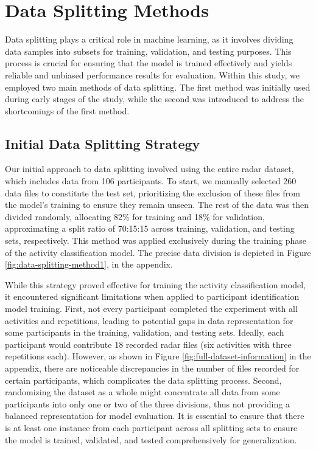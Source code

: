 \documentclass{l4proj}
\begin{document}
\section{Data Splitting Methods}
Data splitting plays a critical role in machine learning, as it involves dividing data samples into subsets for training, validation, and testing purposes. This process is crucial for ensuring that the model is trained effectively and yields reliable and unbiased performance results for evaluation. Within this study, we employed two main methods of data splitting. The first method was initially used during early stages of the study, while the second was introduced to address the shortcomings of the first method.

\subsection{Initial Data Splitting Strategy}
Our initial approach to data splitting involved using the entire radar dataset, which includes data from 106 participants. To start, we manually selected 260 data files to constitute the test set, prioritizing the exclusion of these files from the model's training to ensure they remain unseen. The rest of the data was then divided randomly, allocating 82\% for training and 18\% for validation, approximating a split ratio of 70:15:15 across training, validation, and testing sets, respectively.  This method was applied exclusively during the training phase of the activity classification model. The precise data division is depicted in Figure \ref{fig:data-splitting-method1}, in the appendix.

While this strategy proved effective for training the activity classification model, it encountered significant limitations when applied to participant identification model training. First, not every participant completed the experiment with all activities and repetitions, leading to potential gaps in data representation for some participants in the training, validation, and testing sets. Ideally, each participant would contribute 18 recorded radar files (six activities with three repetitions each). However, as shown in Figure \ref{fig:full-dataset-information} in the appendix, there are noticeable discrepancies in the number of files recorded for certain participants, which complicates the data splitting process. Second, randomizing the dataset as a whole might concentrate all data from some participants into only one or two of the three divisions, thus not providing a balanced representation for model evaluation. It is essential to ensure that there is at least one instance from each participant across all splitting sets to ensure the model is trained, validated, and tested comprehensively for generalization.
\end{document}
